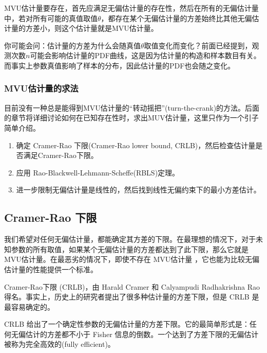             MVU估计量要存在，首先应满足无偏估计量的存在性，然后在所有的无偏估计量中，若对所有可能的真值取值$\theta$，都存在某个无偏估计量的方差始终比其他无偏估计量的方差小，则这个估计量就是MVU估计量。

            你可能会问：估计量的方差为什么会随真值$\theta$取值变化而变化？前面已经提到，观测次数$n$可能会影响估计量的PDF曲线，这是因为估计量的构造和样本数目有关。而事实上参数真值影响了样本的分布，因此估计量的PDF也会随之变化。

        \subsubsection{MVU估计量的求法}
            目前没有一种总是能得到MVU估计量的“转动摇把”(turn-the-crank)的方法。后面的章节将详细讨论如何在已知存在性时，求出MUV估计量，这里只作为一个引子简单介绍。
            
            
            \begin{enumerate}[label=法\chinese*：,itemjoin=\\\hspace*{\parindent}, leftmargin=1.4cm, rightmargin=2.5cm]
                \item 确定 Cramer-Rao 下限(Cramer-Rao lower bound, CRLB)，然后检查估计量是否满足Cramer-Rao下限。
                \item 应用 Rao-Blackwell-Lehmann-Scheffe(RBLS)定理。
                \item 进一步限制无偏估计量是线性的，然后找到线性无偏约束下的最小方差估计。
            \end{enumerate}

    \subsection{Cramer-Rao 下限}
        我们希望对任何无偏估计量，都能确定其方差的下限。在最理想的情况下，对于未知参数的所有取值，如果某个无偏估计量的方差都达到了此下限，那么它就是MVU估计量。在最恶劣的情况下，即使不存在 MVU估计量 ，它也能为比较无偏估计量的性能提供一个标准。

        Cramer-Rao下限 (CRLB)，由 Harald Cramer 和 Calyampudi Radhakrishna Rao 得名。事实上，历史上的研究者提出了很多种估计量的方差下限，但是 CRLB 是最容易确定的。
        
        CRLB 给出了一个确定性参数的无偏估计量的方差下限。它的最简单形式是：任何无偏估计的方差都不小于 Fisher 信息的倒数。一个达到了方差下限的无偏估计被称为完全高效的(fully efficient)。

